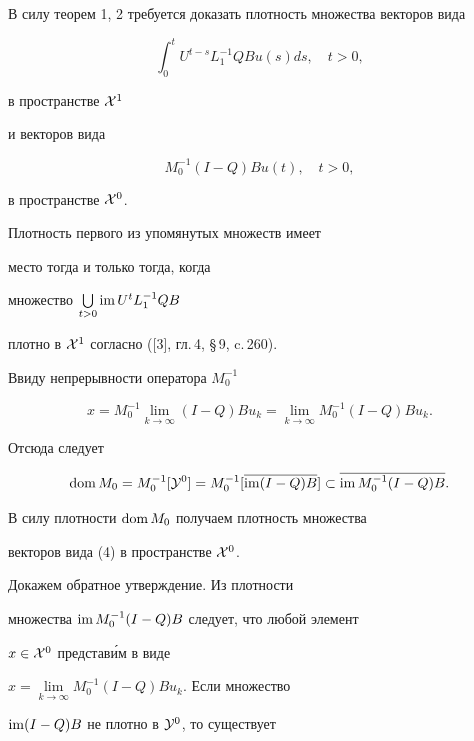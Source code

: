 \begin{pf}


В силу теорем 1, 2 требуется доказать плотность множества векторов вида


$$


\int_0^t U^{t-s}L^{-1}_1Q B u(s)ds,\quad t>0,


$$


в пространстве ${{\cal X}}^1$


и векторов вида


\begin{equation}


M_0^{-1}(I-Q)B u(t),\quad t>0,


\end{equation}


в пространстве ${{\cal X}}^0$.


Плотность первого из упомянутых множеств имеет


место тогда и только тогда, когда


множество $\bigcup\limits_{t>0}\operatorname{im} U^tL_1^{-1}Q B$


плотно в ${\cal X}^1$ согласно ([3], гл.\,4, \S\,9, c.\,260).


Ввиду непрерывности оператора $M_0^{-1}$


$$


x=M_0^{-1}\lim\limits_{k\to\infty}(I-Q)B u_k=


\lim\limits_{k\to\infty}M_0^{-1}(I-Q)B u_k.


$$


Отсюда следует


$$


\dom M_0=M_0^{-1}[{\cal Y}^0]=


M_0^{-1}[\overline{\im(I-Q)B}]\subset


\overline{\im M_0^{-1}(I-Q)B}.


$$


В силу плотности $\operatorname{dom} M_0$ получаем плотность множества


векторов вида (4) в пространстве ${\cal X}^0$.





Докажем обратное утверждение. Из плотности


множества $\operatorname{im} M_0^{-1}(I-Q)B$ следует, что любой элемент


$x\in{\cal X}^0$ представ\'им в виде


$x=\lim\limits_{k\to\infty}M_0^{-1}(I-Q)B u_k$. Если множество


$\operatorname{im}(I-Q)B$ не плотно в ${\cal Y}^0$, то существует



\end{pf}
